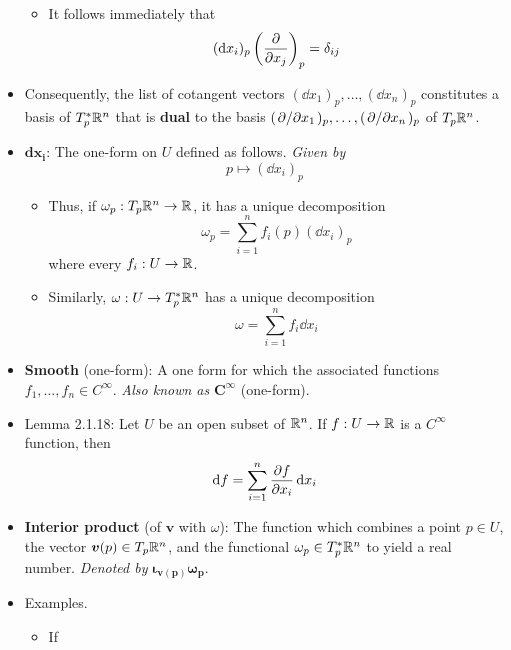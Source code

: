 \documentclass[../notes.tex]{subfiles}
\begin{document}
\begin{itemize}
\begin{itemize}
        \item It follows immediately that
        \begin{equation*}
            (\dd x_i)_p\left( \pdv{x_j} \right)_p = \delta_{ij}
        \end{equation*}
    \end{itemize}
    \item Consequently, the list of cotangent vectors $(\dd x_1)_p,\dots,(\dd x_n)_p$ constitutes a basis of $T_p^*\mathbb{R}^n$ that is \textbf{dual} to the basis $(\pdv*{x_1})_p,\dots,(\pdv*{x_n})_p$ of $T_p\mathbb{R}^n$.
    \item $\bm{\mathbf{d}x_i}$: The one-form on $U$ defined as follows. \emph{Given by}
    \begin{equation*}
        p \mapsto (\dd x_i)_p
    \end{equation*}
    \begin{itemize}
        \item Thus, if $\omega_p:T_p\mathbb{R}^n\to\mathbb{R}$, it has a unique decomposition
        \begin{equation*}
            \omega_p = \sum_{i=1}^nf_i(p)(\dd x_i)_p
        \end{equation*}
        where every $f_i:U\to\mathbb{R}$.
        \item Similarly, $\omega:U\to T_p^*\mathbb{R}^n$ has a unique decomposition
        \begin{equation*}
            \omega = \sum_{i=1}^nf_i\dd x_i
        \end{equation*}
    \end{itemize}
    \item \textbf{Smooth} (one-form): A one form for which the associated functions $f_1,\dots,f_n\in C^\infty$. \emph{Also known as} $\bm{C^\infty}$ (one-form).
    \item Lemma 2.1.18: Let $U$ be an open subset of $\mathbb{R}^n$. If $f:U\to\mathbb{R}$ is a $C^\infty$ function, then
    \begin{equation*}
        \dd f = \sum_{i=1}^n\pdv{f}{x_i}\dd{x_i}
    \end{equation*}
    \item \textbf{Interior product} (of $\bm{v}$ with $\omega$): The function which combines a point $p\in U$, the vector $\bm{v}(p)\in T_p\mathbb{R}^n$, and the functional $\omega_p\in T_p^*\mathbb{R}^n$ to yield a real number. \emph{Denoted by} $\bm{\iota_{\pmb{v}(p)}\omega_p}$.
    \item Examples.
    \begin{itemize}
        \item If

\end{itemize}
\end{itemize}
\end{document}
